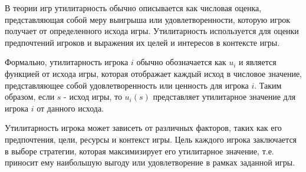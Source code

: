 В теории игр утилитарность обычно описывается как числовая оценка, представляющая собой меру выигрыша или удовлетворенности, которую игрок получает от определенного исхода игры. Утилитарность используется для оценки предпочтений игроков и выражения их целей и интересов в контексте игры.

Формально, утилитарность игрока \(i\) обычно обозначается как \(u_i\) и является функцией от исхода игры, которая отображает каждый исход в числовое значение, представляющее собой удовлетворенность или ценность для игрока \(i\). Таким образом, если \(s\) - исход игры, то \(u_i(s)\) представляет утилитарное значение для игрока \(i\) от данного исхода.

Утилитарность игрока может зависеть от различных факторов, таких как его предпочтения, цели, ресурсы и контекст игры. Цель каждого игрока заключается в выборе стратегии, которая максимизирует его утилитарное значение, т.е. приносит ему наибольшую выгоду или удовлетворение в рамках заданной игры.
